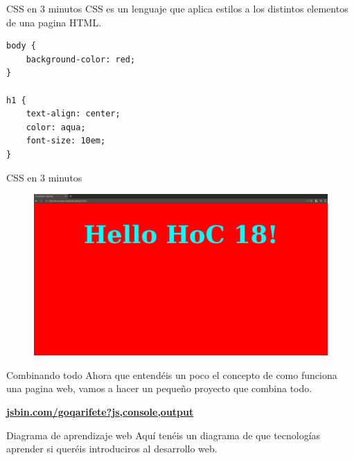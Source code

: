 \documentclass{beamer}
\begin{document}
\begin{frame}[fragile]{CSS en 3 minutos}
CSS es un lenguaje que aplica estilos a los distintos elementos de una pagina HTML.
\begin{lstlisting}
body {
    background-color: red;
}

h1 {
    text-align: center;
    color: aqua;
    font-size: 10em;
}
\end{lstlisting}
\end{frame}


\begin{frame}{CSS en 3 minutos}
\begin{figure}
    \centering
    \includegraphics[width=\textwidth]{images/helloworldcss.png}
\end{figure}
\end{frame}

\begin{frame}{Combinando todo}
    Ahora que entendéis un poco el concepto de como funciona una pagina web, vamos a hacer un pequeño proyecto que combina todo.
    
    \centering\textbf{\hyperlink{https://jsbin.com/goqarifete/1/edit?js,console,output}{\Large jsbin.com/goqarifete?js,console,output}}
\end{frame}

\begin{frame}[fragile]{Diagrama de aprendizaje web}
Aquí tenéis un diagrama de que tecnologías aprender si queréis introduciros al desarrollo web.

\end{frame}
\end{document}
